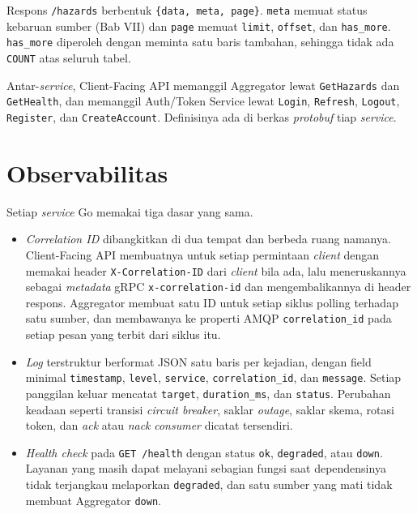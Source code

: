 Respons \texttt{/hazards} berbentuk \texttt{\{data, meta, page\}}. \texttt{meta} memuat status kebaruan sumber (Bab VII) dan \texttt{page} memuat \texttt{limit}, \texttt{offset}, dan \texttt{has\_more}. \texttt{has\_more} diperoleh dengan meminta satu baris tambahan, sehingga tidak ada \texttt{COUNT} atas seluruh tabel.

Antar-\textit{service}, Client-Facing API memanggil Aggregator lewat \texttt{GetHazards} dan \texttt{GetHealth}, dan memanggil Auth/Token Service lewat \texttt{Login}, \texttt{Refresh}, \texttt{Logout}, \texttt{Register}, dan \texttt{CreateAccount}. Definisinya ada di berkas \textit{protobuf} tiap \textit{service}.

\section{Observabilitas}

Setiap \textit{service} Go memakai tiga dasar yang sama.

\begin{itemize}
\item
  \textit{Correlation ID} dibangkitkan di dua tempat dan berbeda ruang namanya. Client-Facing API membuatnya untuk setiap permintaan \textit{client} dengan memakai header \texttt{X-Correlation-ID} dari \textit{client} bila ada, lalu meneruskannya sebagai \textit{metadata} gRPC \texttt{x-correlation-id} dan mengembalikannya di header respons. Aggregator membuat satu ID untuk setiap siklus polling terhadap satu sumber, dan membawanya ke properti AMQP \texttt{correlation\_id} pada setiap pesan yang terbit dari siklus itu.
\item
  \textit{Log} terstruktur berformat JSON satu baris per kejadian, dengan field minimal \texttt{timestamp}, \texttt{level}, \texttt{service}, \texttt{correlation\_id}, dan \texttt{message}. Setiap panggilan keluar mencatat \texttt{target}, \texttt{duration\_ms}, dan \texttt{status}. Perubahan keadaan seperti transisi \textit{circuit breaker}, saklar \textit{outage}, saklar skema, rotasi token, dan \textit{ack} atau \textit{nack} \textit{consumer} dicatat tersendiri.
\item
  \textit{Health check} pada \texttt{GET /health} dengan status \texttt{ok}, \texttt{degraded}, atau \texttt{down}. Layanan yang masih dapat melayani sebagian fungsi saat dependensinya tidak terjangkau melaporkan \texttt{degraded}, dan satu sumber yang mati tidak membuat Aggregator \texttt{down}.
\end{itemize}

